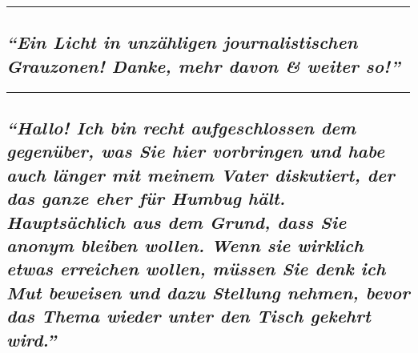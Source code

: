 \begin{center}\rule{0.5\linewidth}{\linethickness}\end{center}

\hypertarget{ein-licht-in-unzuxe4hligen-journalistischen-grauzonen-danke-mehr-davon--weiter-so}{%
\subsection{\texorpdfstring{\emph{``Ein Licht in unzähligen
journalistischen Grauzonen! Danke, mehr davon \& weiter
so!''}}{``Ein Licht in unzähligen journalistischen Grauzonen! Danke, mehr davon \& weiter so!''}}\label{ein-licht-in-unzuxe4hligen-journalistischen-grauzonen-danke-mehr-davon--weiter-so}}

\begin{center}\rule{0.5\linewidth}{\linethickness}\end{center}

\hypertarget{hallo-ich-bin-recht-aufgeschlossen-dem-gegenuxfcber-was-sie-hier-vorbringen-und-habe-auch-luxe4nger-mit-meinem-vater-diskutiert-der-das-ganze-eher-fuxfcr-humbug-huxe4lt-hauptsuxe4chlich-aus-dem-grund-dass-sie-anonym-bleiben-wollen-wenn-sie-wirklich-etwas-erreichen-wollen-muxfcssen-sie-denk-ich-mut-beweisen-und-dazu-stellung-nehmen-bevor-das-thema-wieder-unter-den-tisch-gekehrt-wird}{%
\subsection{\texorpdfstring{\emph{``Hallo! Ich bin recht aufgeschlossen
dem gegenüber, was Sie hier vorbringen und habe auch länger mit meinem
Vater diskutiert, der das ganze eher für Humbug hält. Hauptsächlich aus
dem Grund, dass Sie anonym bleiben wollen. Wenn sie wirklich etwas
erreichen wollen, müssen Sie denk ich Mut beweisen und dazu Stellung
nehmen, bevor das Thema wieder unter den Tisch gekehrt
wird.''}}{``Hallo! Ich bin recht aufgeschlossen dem gegenüber, was Sie hier vorbringen und habe auch länger mit meinem Vater diskutiert, der das ganze eher für Humbug hält. Hauptsächlich aus dem Grund, dass Sie anonym bleiben wollen. Wenn sie wirklich etwas erreichen wollen, müssen Sie denk ich Mut beweisen und dazu Stellung nehmen, bevor das Thema wieder unter den Tisch gekehrt wird.''}}\label{hallo-ich-bin-recht-aufgeschlossen-dem-gegenuxfcber-was-sie-hier-vorbringen-und-habe-auch-luxe4nger-mit-meinem-vater-diskutiert-der-das-ganze-eher-fuxfcr-humbug-huxe4lt-hauptsuxe4chlich-aus-dem-grund-dass-sie-anonym-bleiben-wollen-wenn-sie-wirklich-etwas-erreichen-wollen-muxfcssen-sie-denk-ich-mut-beweisen-und-dazu-stellung-nehmen-bevor-das-thema-wieder-unter-den-tisch-gekehrt-wird}}

